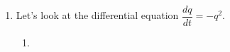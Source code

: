 \documentclass[main]{subfiles}
\begin{document}
\begin{enumerate}[resume]


  
  



  \item 

  Let's look at the differential equation $\dfrac{dq}{dt} = -q^2$.

  \begin{enumerate}
  \item


\end{enumerate}
\end{enumerate}
\end{document}
